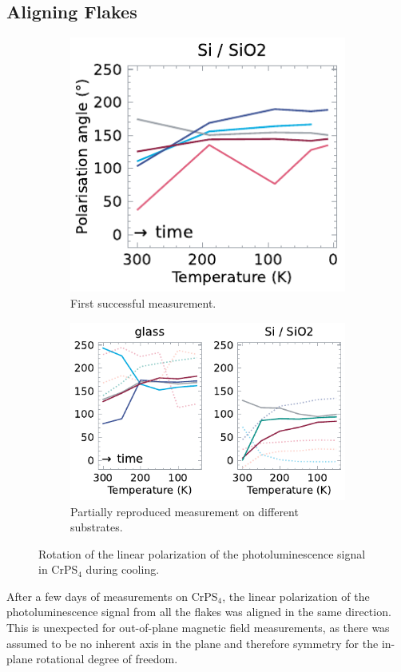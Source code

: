\documentclass[
	oneside,
	parskip=half,
	a4paper,
]{scrbook}
\begin{document}
\subsection{Aligning Flakes}
\label{sec:aligning flakes}
\begin{figure}
	\begin{subfigure}{2.5in}
		\includegraphics{../figures/2024-01-23 rotating pl.pdf}
		\caption{First successful measurement.}
		\label{fig:alignment first}
	\end{subfigure}
	\begin{subfigure}{3.5in}
		\includegraphics{../figures/2024-01-29 rotating pl.pdf}
		\caption{Partially reproduced measurement on different substrates.}
		\label{fig:alignment second}
	\end{subfigure}
	\caption{Rotation of the linear polarization of the photoluminescence signal in CrPS$_4$ during cooling.}
	\label{fig:alignment}
\end{figure}
After a few days of measurements on CrPS$_4$, the linear polarization of the photoluminescence signal from all the flakes was aligned in the same direction.
This is unexpected for out-of-plane magnetic field measurements, as there was assumed to be no inherent axis in the plane and therefore symmetry for the in-plane rotational degree of freedom.
\end{document}
